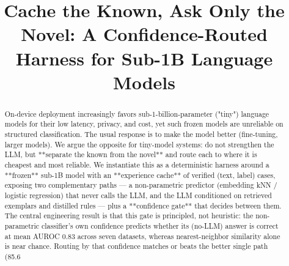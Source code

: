 \documentclass[conference]{IEEEtran}
\title{Cache the Known, Ask Only the Novel: A Confidence-Routed Harness for Sub-1B Language Models}
\author{\IEEEauthorblockN{Ryota Nakamura}\IEEEauthorblockA{Musashino University\\ryota.nakamura@ds.musashino-u.ac.jp}}
\begin{document}
\maketitle
\begin{abstract}
On-device deployment increasingly favors sub-1-billion-parameter ("tiny") language models for their low latency, privacy, and cost, yet such frozen models are unreliable on structured classification. The usual response is to make the model better (fine-tuning, larger models). We argue the opposite for tiny-model systems: do not strengthen the LLM, but **separate the known from the novel** and route each to where it is cheapest and most reliable. We instantiate this as a deterministic harness around a **frozen** sub-1B model with an **experience cache** of verified (text, label) cases, exposing two complementary paths --- a non-parametric predictor (embedding kNN / logistic regression) that never calls the LLM, and the LLM conditioned on retrieved exemplars and distilled rules --- plus a **confidence gate** that decides between them. The central engineering result is that this gate is principled, not heuristic: the non-parametric classifier's own confidence predicts whether its (no-LLM) answer is correct at mean AUROC 0.83 across seven datasets, whereas nearest-neighbor similarity alone is near chance. Routing by that confidence matches or beats the better single path (85.6%
\end{abstract}



\end{document}
